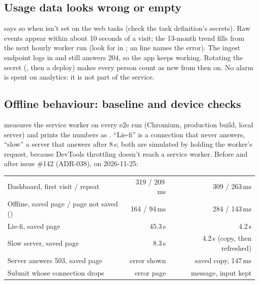 \subsection{Usage data looks wrong or empty}
 says so when  isn't set on the web tasks (check
the task definition's secrets). Raw events appear within about 10 seconds of a visit; the
13-month trend fills from the next hourly worker run (look for  in
; an  line names the error). The ingest endpoint logs
 in  and still answers 204, so the
app keeps working. Rotating the secret
(, then a deploy) makes every person
count as new from then on. No alarm is spent on analytics: it is not part of the service.

\subsection{Offline behaviour: baseline and device checks}\label{sec:ops-offline}
 measures the service worker on every e2e run (Chromium, production
build, local server) and prints the numbers as . ``Lie-fi'' is a connection
that never answers, ``slow'' a server that answers after 8\,s; both are simulated by holding the
worker's request, because DevTools throttling doesn't reach a service worker. Before and after
issue \#142 (ADR-038), on 2026-11-25:

{\tablefont
\begin{xltabular}{\linewidth}{@{}L r r@{}}
  \toprule
   &  & \\
  \midrule
  \endhead
  Dashboard, first visit / repeat & 319 / 209\,ms & 309 / 263\,ms\\
  Offline, saved page / page not saved () & 164 / 94\,ms & 284 / 143\,ms\\
  Lie-fi, saved page & 45.3\,s & 4.2\,s\\
  Slow server, saved page & 8.3\,s & 4.2\,s (copy, then refreshed)\\
  Server answers 503, saved page & error shown & saved copy, 147\,ms\\
  Submit whose connection drops & error page & message, input kept\\
  \bottomrule
\end{xltabular}}


